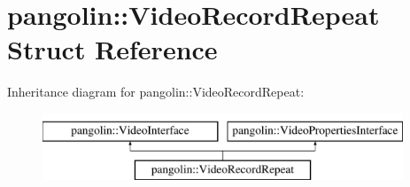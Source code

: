 \hypertarget{structpangolin_1_1_video_record_repeat}{}\section{pangolin\+:\+:Video\+Record\+Repeat Struct Reference}
\label{structpangolin_1_1_video_record_repeat}
Inheritance diagram for pangolin\+:\+:Video\+Record\+Repeat\+:\begin{figure}[H]
\begin{center}
\leavevmode
\includegraphics[height=2.000000cm]{structpangolin_1_1_video_record_repeat}
\end{center}
\end{figure}
